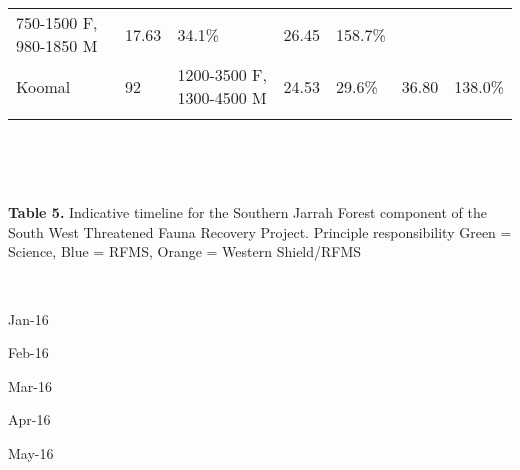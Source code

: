 \documentclass[version=last,
    paper=a4,                               %
    10pt,                                   %
    dvipsnames,
    oneside,                              %
    headings=openany,                       %
    open=any,
    BCOR=7mm,                               %
    DIV=15,     %
]{scrbook}
\begin{document}
\begin{longtable}[c]{@{}lllllll@{}}
\begin{minipage}[t]{0.12\columnwidth}
750-1500 F, 980-1850 M
\end{minipage} & \begin{minipage}[t]{0.12\columnwidth}\raggedright
17.63
\end{minipage} & \begin{minipage}[t]{0.12\columnwidth}\raggedright
34.1\%
\end{minipage} & \begin{minipage}[t]{0.12\columnwidth}\raggedright
26.45
\end{minipage} & \begin{minipage}[t]{0.12\columnwidth}\raggedright
158.7\%
\end{minipage}
\\\addlinespace
\begin{minipage}[t]{0.12\columnwidth}\raggedright
Koomal
\end{minipage} & \begin{minipage}[t]{0.12\columnwidth}\raggedright
92
\end{minipage} & \begin{minipage}[t]{0.12\columnwidth}\raggedright
1200-3500 F, 1300-4500 M
\end{minipage} & \begin{minipage}[t]{0.12\columnwidth}\raggedright
24.53
\end{minipage} & \begin{minipage}[t]{0.12\columnwidth}\raggedright
29.6\%
\end{minipage} & \begin{minipage}[t]{0.12\columnwidth}\raggedright
36.80
\end{minipage} & \begin{minipage}[t]{0.12\columnwidth}\raggedright
138.0\%
\end{minipage}
\\\addlinespace
\bottomrule
\end{longtable}

~

~

\textbf{Table 5.} Indicative timeline for the Southern Jarrah Forest
component of the South West Threatened Fauna Recovery Project. Principle
responsibility Green = Science, Blue = RFMS, Orange = Western
Shield/RFMS

~

Jan-16

Feb-16

Mar-16

Apr-16

May-16
\end{document}
